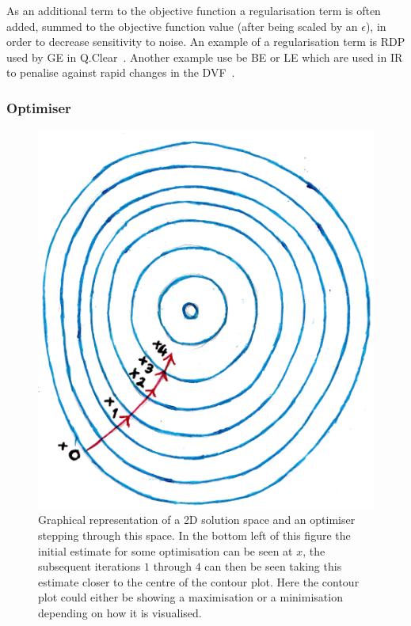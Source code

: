                 As an additional term to the objective function a regularisation term is often added, summed to the objective function value (after being scaled by an $\epsilon$), in order to decrease sensitivity to noise. An example of a regularisation term is \gls{RDP} used by \gls{GE} in Q.Clear~\parencite{qclear}. Another example use be \gls{BE} or \gls{LE} which are used in \gls{IR} to penalise against rapid changes in the \gls{DVF}~\parencite{Modersitzki2009Fair:FlexibleRegistration}.
                
            \subsubsection{Optimiser} \label{sec:optimiser}
                \begin{figure}
                    \centering
                        
                    \includegraphics[width=1.0\linewidth]{figures/background_optimisation.png}
                        
                    \captionsetup{singlelinecheck=false, justification=raggedright}
                    \caption{Graphical representation of a \gls{2D} solution space and an optimiser stepping through this space. In the bottom left of this figure the initial estimate for some optimisation can be seen at $x$, the subsequent iterations $1$ through $4$ can then be seen taking this estimate closer to the centre of the contour plot. Here the contour plot could either be showing a maximisation or a minimisation depending on how it is visualised.} \label{fig:optimiser_optimisation}
                \end{figure}
                
